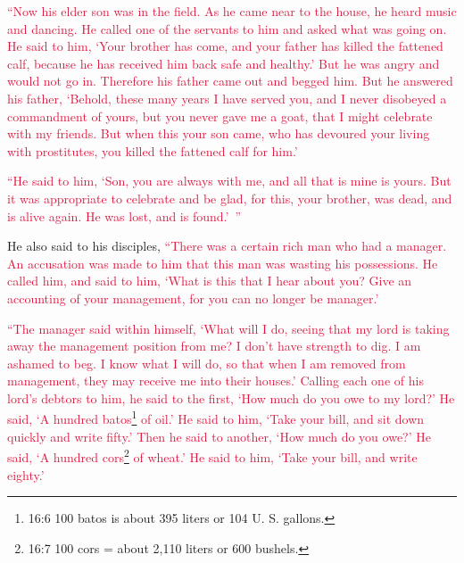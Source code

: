 \myverse{}\textcolor{crimson}{“Now his elder son was in the field. As he came near to
	the house, he heard music and dancing.
}
\myverse{}\textcolor{crimson}{He called one of the servants to him and asked what was going on.
}
\myverse{}\textcolor{crimson}{He said to him, ‘Your brother has come, and your father has killed the
	fattened calf, because he has received him back safe and healthy.’
}
\myverse{}\textcolor{crimson}{But he was angry and would not go in. Therefore his father came out and
	begged him.
}
\myverse{}\textcolor{crimson}{But he answered his father, ‘Behold, these many years I have served you,
	and I never disobeyed a commandment of yours, but you never gave me a goat, that I might celebrate with
	my friends.
}
\myverse{}\textcolor{crimson}{But when this your son came, who has devoured your living with prostitutes,
	you killed the fattened calf for him.’}

\myverse{}\textcolor{crimson}{“He said to him, ‘Son, you are always with me, and all that
	is mine is yours.
}
\myverse{}\textcolor{crimson}{But it was appropriate to celebrate and be glad, for this, your brother,
	was dead, and is alive again. He was lost, and is found.’ ”}


\mychapter{} \myverse*{}He also said to his disciples,
\textcolor{crimson}{“There was a certain rich man who had a manager. An accusation was made to him that this man was wasting
	his possessions.
}
\myverse{}\textcolor{crimson}{He called him, and said to him, ‘What is this that I hear about you? Give
	an accounting of your management, for you can no longer be manager.’
}

\myverse{}\textcolor{crimson}{“The manager said within himself, ‘What will I do, seeing
	that my lord is taking away the management position from me? I don’t have strength to dig. I am ashamed
	to beg.
}
\myverse{}\textcolor{crimson}{I know what I will do, so that when I am removed from management, they
	may receive me into their houses.’
}
\myverse{}\textcolor{crimson}{Calling each one of his lord’s debtors to him, he said to the first, ‘How
	much do you owe to my lord?’
}
\myverse{}\textcolor{crimson}{He said, ‘A hundred batos}\footnote{16:6 100 batos is about 395 liters or 104 U. S. gallons.}
\textcolor{crimson}{of oil.’ He said to him, ‘Take your bill, and sit down quickly and write fifty.’
}
\myverse{}\textcolor{crimson}{Then he said to another, ‘How much do you owe?’ He said, ‘A hundred cors}\footnote{16:7 100 cors = about 2,110 liters or 600 bushels.}
\textcolor{crimson}{of wheat.’ He said to him, ‘Take your bill, and write eighty.’}

